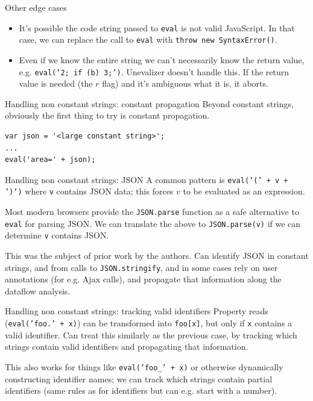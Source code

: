 \documentclass{beamer}
\begin{document}
\begin{frame}{Other edge cases}
\begin{itemize}
\item It's possible the code string passed to {\tt eval} is not valid
JavaScript.  In that case, we can replace the call to {\tt eval} with
{\tt throw new SyntaxError()}.
\item Even if we know the entire string we can't necessarily know the
return value, e.g. {\tt eval('2; if (b) 3;')}. Unevalizer doesn't handle
this. If the return value is needed (the $r$ flag) and it's ambiguous what
it is, it aborts.
\end{itemize}
\end{frame}

\begin{frame}[fragile]{Handling non constant strings: constant propagation}
Beyond constant strings, obviously the first thing to try is constant
propagation. 

\begin{verbatim}
var json = '<large constant string>';
...
eval('area=' + json);
\end{verbatim}
\end{frame}

\begin{frame}{Handling non constant strings: JSON}
A common pattern is {\tt eval('(' + v + ')')} where {\tt v} contains JSON
data; this forces $v$ to be evaluated as an expression. \vspace{5mm}

Most modern browsers provide the {\tt JSON.parse} function as a safe
alternative to {\tt eval} for parsing JSON. We can translate the above
to {\tt JSON.parse(v)} if we can determine {\tt v} contains JSON.
\vspace{5mm}

This was the subject of prior work by the authors. Can identify JSON in
constant strings, and from calls to {\tt JSON.stringify}, and in some
cases rely on user annotations (for e.g. Ajax calls), and propagate that
information along the dataflow analysis.
\end{frame}

\begin{frame}{Handling non constant strings: tracking valid identifiers}
Property reads ({\tt eval('foo.' + x)}) can be
transformed into {\tt foo[x]}, but only if {\tt x} contains a valid
identifier. Can treat this similarly as the previous case, by tracking
which strings contain valid identifiers and propagating that information.

\vspace{5mm}

This also works for things like {\tt eval('foo\_' + x)} or otherwise
dynamically constructing identifier names; we can track which strings
contain partial identifiers (same rules as for identifiers but can e.g.
start with a number).
\end{frame}
\end{document}
